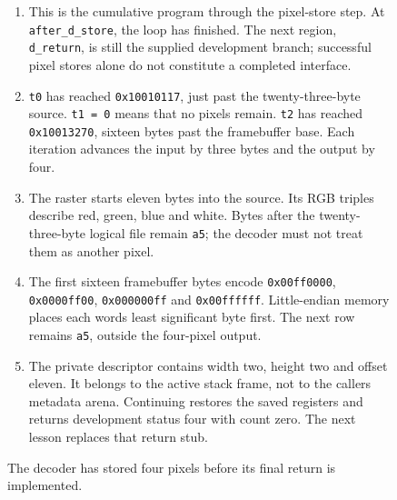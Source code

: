 \begin{figure}[htbp]
\begin{minipage}{\linewidth}
\begin{enumerate}
            \setlength{\parsep}{0pt}
      \item This is the cumulative program through the pixel-store step. At \texttt{after\_d\_store}, the loop has finished. The next region, \texttt{d\_return}, is still the supplied development branch; successful pixel stores alone do not constitute a completed interface.
      \item \texttt{t0} has reached \texttt{0x10010117}, just past the twenty-three-byte source. \texttt{t1 = 0} means that no pixels remain. \texttt{t2} has reached \texttt{0x10013270}, sixteen bytes past the framebuffer base. Each iteration advances the input by three bytes and the output by four.
      \item The raster starts eleven bytes into the source. Its RGB triples describe red, green, blue and white. Bytes after the twenty-three-byte logical file remain \texttt{a5}; the decoder must not treat them as another pixel.
      \item The first sixteen framebuffer bytes encode \texttt{0x00ff0000}, \texttt{0x0000ff00}, \texttt{0x000000ff} and \texttt{0x00ffffff}. Little-endian memory places each word\textquotesingle s least significant byte first. The next row remains \texttt{a5}, outside the four-pixel output.
      \item The private descriptor contains width two, height two and offset eleven. It belongs to the active stack frame, not to the caller\textquotesingle s metadata arena. Continuing restores the saved registers and returns development status four with count zero. The next lesson replaces that return stub.
    \end{enumerate}
  \end{minipage}
  \caption{The decoder has stored four pixels before its final return is implemented.}
  \label{capture:029-binary-ppm-f02}
  \label{ppm-f02}
\end{figure}
\par
